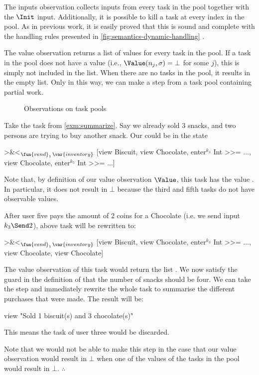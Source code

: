 The inputs observation collects inputs from every task in the pool
together with the $\Init$ input.
Additionally, it is possible to kill a task at every index in the pool.
As in previous work, it is easily proved that this is sound and complete with the handling rules presented in \cref{fig:semantics-dynamic-handling} \cite{Steenvoorden22}.

The value observation returns a list of values for every task in the pool.
If a task in the pool does not have a value (i.e., $\Value(n_j,\sigma) = \bot$ for some $j$),
this is simply not included in the list.
When there are no tasks in the pool, it results in the empty list.
Only in this way,
we can make a step from a task pool containing partial work.

\begin{figure}
  \caption{Observations on task pools}
  \label{fig:observations-dynamic}
\end{figure}

\begin{example}
  \label{exm:partial-work}
  Take the  task from \cref{exm:summarize}.
  Say we already sold 3 snacks, and two persons are trying to buy another snack.
  Our  could be in the state
  \begin{TASK}
    >&<$_{\fun{vend}_1\,\var{inventory}}$ [view Biscuit, view Chocolate,
      enter$^{k_3}$ Int >>= ..., view Chocolate, enter$^{k_5}$ Int >>= ...]
  \end{TASK}
  Note that, by definition of our value observation $\Value$,
  this task has the value .
  In particular, it does not result in $\bot$ because the third and fifth tasks do not have observable values.

  After user five pays the amount of 2 coins for a Chocolate (i.e. we send input $k_3\Send2$),
  above task will be rewritten to:
  \begin{TASK}
    >&<$_{\fun{vend}_1\,\var{inventory}}$ [view Biscuit, view Chocolate,
      enter$^{k_3}$ Int >>= ..., view Chocolate, view Chocolate]
  \end{TASK}
  The value observation of this task would return the list .
  We now satisfy the guard in the definition of  that the number of snacks should be four.
  We can take the step and immediately rewrite the whole task to summarise the different purchases that were made.
  The result will be:
  \begin{TASK}
    view "Sold 1 biscuit(s) and 3 chocolate(s)"
  \end{TASK}
  This means the  task of user three would be discarded.

  Note that we would not be able to make this step in the case that our value observation would result in $\bot$ when one of the values of the tasks in the pool would result in $\bot$.
\hfill$\therefore$\end{example}